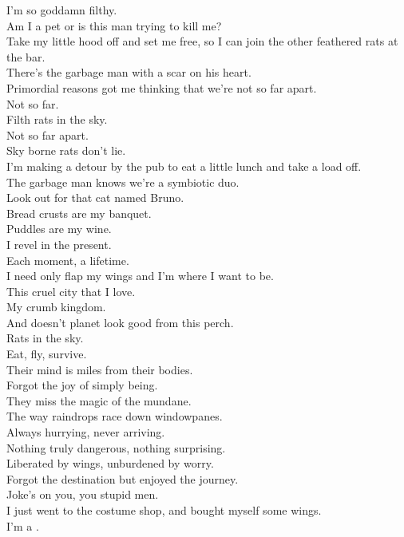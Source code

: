 I'm so goddamn filthy. \\
Am I a pet or is this man trying to kill me? \\
Take my little hood off and set me free, so I can join the other feathered rats at the bar. \\
There's the garbage man with a scar on his heart. \\
Primordial reasons got me thinking that we're not so far apart. \\
Not so far. \\
Filth rats in the sky. \\
Not so far apart. \\

Sky borne rats don't lie. \\
I'm making a detour by the pub to eat a little lunch and take a load off. \\
The garbage man knows we're a symbiotic duo. \\
Look out for that cat named Bruno. \\

Bread crusts are my banquet. \\
Puddles are my wine. \\
I revel in the present. \\
Each moment, a lifetime. \\
I need only flap my wings and I'm where I want to be. \\
This cruel city that I love. \\
My crumb kingdom. \\
And doesn't planet  look good from this perch. \\
Rats in the sky. \\
Eat, fly, survive. \\

Their mind is miles from their bodies. \\
Forgot the joy of simply being. \\
They miss the magic of the mundane. \\
The way raindrops race down windowpanes. \\
Always hurrying, never arriving. \\
Nothing truly dangerous, nothing surprising. \\
Liberated by wings, unburdened by worry. \\
Forgot the destination but enjoyed the journey. \\

Joke's on you, you stupid men. \\
I just went to the costume shop, and bought myself some wings. \\
I'm a . \\

